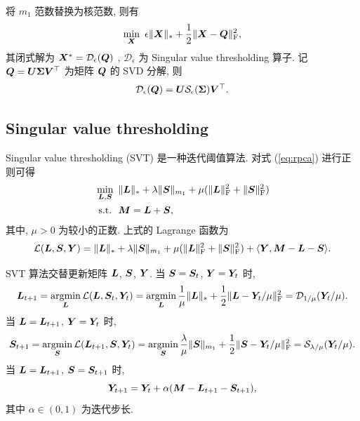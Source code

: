 \documentclass[12pt]{article}
\begin{document}
将 $m_1$ 范数替换为核范数, 则有
\begin{equation}
  \min_{\bm{X}}~\epsilon\|\bm{X}\|_{*}+\frac{1}{2}\|\bm{X}-\bm{Q}\|_{\text{F}}^2,
\end{equation}
其闭式解为 $\bm{X}^*=\mathcal{D}_\epsilon(\bm{Q})$ \cite{cai2010singular}, $\mathcal{D}_\epsilon$ 为 Singular value thresholding 算子. 记 $\bm{Q}=\bm{U}\bm{\Sigma}\bm{V}^\top$ 为矩阵 $\bm{Q}$ 的 SVD 分解, 则
\begin{equation}
  \mathcal{D}_\epsilon(\bm{Q})=\bm{U}\mathcal{S}_\epsilon(\bm{\Sigma})\bm{V}^\top.
\end{equation}

\subsection{Singular value thresholding}
\label{subsec:svt}

Singular value thresholding (SVT) \cite{cai2010singular} 是一种迭代阈值算法. 对式 (\ref{eq:rpca}) 进行正则可得
\begin{equation}
  \begin{aligned}
    &\min_{\bm{L},\bm{S}}~\|\bm{L}\|_{*}+\lambda\|\bm{S}\|_{m_1}+\mu(\|\bm{L}\|_{\text{F}}^2+\|\bm{S}\|_{\text{F}}^2) \\
    &~\text{s.t.}~~\bm{M}=\bm{L}+\bm{S},
  \end{aligned}
\end{equation}
其中, $\mu>0$ 为较小的正数. 上式的 Lagrange 函数为
\begin{equation}
  \mathcal{L}(\bm{L},\bm{S},\bm{Y})=\|\bm{L}\|_{*}+\lambda\|\bm{S}\|_{m_1}+\mu(\|\bm{L}\|_{\text{F}}^2+\|\bm{S}\|_{\text{F}}^2)+\langle\bm{Y},\bm{M}-\bm{L}-\bm{S}\rangle.
\end{equation}

SVT 算法交替更新矩阵 $\bm{L}$, $\bm{S}$, $\bm{Y}$. 当 $\bm{S}=\bm{S}_{t}$, $\bm{Y}=\bm{Y}_t$ 时,
\begin{equation}
  \bm{L}_{t+1}
  =\operatorname*{argmin}_{\bm{L}}\mathcal{L}(\bm{L},\bm{S}_t,\bm{Y}_t)
  =\operatorname*{argmin}_{\bm{L}} \frac{1}{\mu}\|\bm{L}\|_{*}+\frac{1}{2}\|\bm{L}-\bm{Y}_t/\mu\|_{\text{F}}^2
  =\mathcal{D}_{1/\mu}(\bm{Y}_t/\mu).
\end{equation}
当 $\bm{L}=\bm{L}_{t+1}$, $\bm{Y}=\bm{Y}_t$ 时,
\begin{equation}
  \bm{S}_{t+1}
  =\operatorname*{argmin}_{\bm{S}}\mathcal{L}(\bm{L}_{t+1},\bm{S},\bm{Y}_t)
  =\operatorname*{argmin}_{\bm{S}} \frac{\lambda}{\mu}\|\bm{S}\|_{m_1}+\frac{1}{2}\|\bm{S}-\bm{Y}_t/\mu\|_{\text{F}}^2
  =\mathcal{S}_{\lambda/\mu}(\bm{Y}_t/\mu).
\end{equation}
当 $\bm{L}=\bm{L}_{t+1}$, $\bm{S}=\bm{S}_{t+1}$ 时,
\begin{equation}
  \bm{Y}_{t+1}
  =\bm{Y}_t+\alpha(\bm{M}-\bm{L}_{t+1}-\bm{S}_{t+1}),
\end{equation}
其中 $\alpha\in(0,1)$ 为迭代步长.
\end{document}
